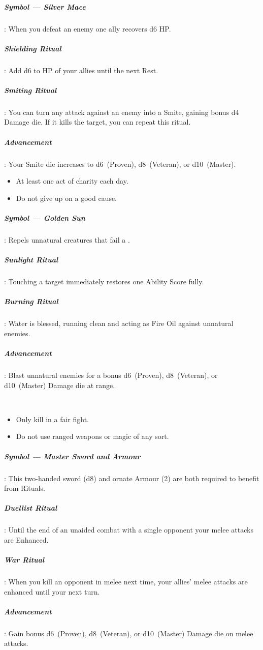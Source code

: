 \documentclass[itdr]{subfiles}
\begin{document}
\subparagraph{Symbol --- Silver Mace}: When you defeat an enemy one ally recovers d6 HP.

\subparagraph{Shielding Ritual}: Add d6 to HP of your allies until the next Rest.

\subparagraph{Smiting Ritual}: You can turn any attack against an enemy into a Smite, gaining bonus d4 Damage die. If it kills the target, you can repeat this ritual.

\subparagraph{Advancement}: Your Smite die increases to d6~(Proven), d8~(Veteran), or d10~(Master).

\vfill
\break

{\em\begin{itemize}
		\item At least one act of charity each day.
		\item Do not give up on a good cause.
\end{itemize}}

\subparagraph{Symbol --- Golden Sun}: Repels unnatural creatures that fail a .

\subparagraph{Sunlight Ritual}: Touching a target immediately restores one Ability Score fully.

\subparagraph{Burning Ritual}: Water is blessed, running clean and acting as Fire Oil against unnatural enemies.

\subparagraph{Advancement}: Blast unnatural enemies for a bonus d6~(Proven), d8~(Veteran), or d10~(Master) Damage die at range.

~

{\em\begin{itemize}
		\item Only kill in a fair fight.
		\item Do not use ranged weapons or magic of any sort.
\end{itemize}}

\subparagraph{Symbol --- Master Sword and Armour}: This two-handed sword (d8) and ornate Armour (2) are both required to benefit from Rituals.

\subparagraph{Duellist Ritual}: Until the end of an unaided combat with a single opponent your melee attacks are Enhanced.

\subparagraph{War Ritual}: When you kill an opponent in melee next time, your allies' melee attacks are enhanced until your next turn.

\subparagraph{Advancement}: Gain bonus d6~(Proven), d8~(Veteran), or d10~(Master) Damage die on melee attacks.
\vfill
\break
\end{document}
